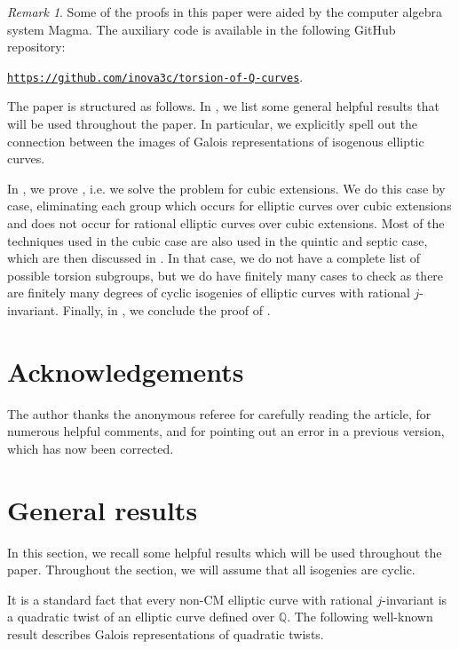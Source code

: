 \documentclass[10pt,leqno]{amsart}
\newcommand{\Q}{\mathbb{Q}}
\theoremstyle{definition}
\theoremstyle{remark}
\newtheorem{remark}[theorem]{Remark}
\numberwithin{theorem}{section}
\begin{document}
\begin{remark}
    Some of the proofs in this paper were aided by the computer algebra system Magma. The auxiliary code is available in the following GitHub repository:
    \begin{center}
        \hyperlink{https://github.com/inova3c/torsion-of-Q-curves}{\texttt{https://github.com/inova3c/torsion-of-Q-curves}}.
    \end{center}


\end{remark}

The paper is structured as follows. In , we list some general helpful results that will be used throughout the paper. In particular, we explicitly spell out the connection between the images of Galois representations of isogenous elliptic curves.

In , we prove , i.e. we solve the problem for cubic extensions. We do this case by case, eliminating each group which occurs for elliptic curves over cubic extensions and does not occur for rational elliptic curves over cubic extensions. Most of the techniques used in the cubic case are also used in the quintic and septic case, which are then discussed in . In that case, we do not have a complete list of possible torsion subgroups, but we do have finitely many cases to check as there are finitely many degrees of cyclic isogenies of elliptic curves with rational $j$-invariant. Finally, in , we conclude the proof of . 

\section*{Acknowledgements}

The author thanks the anonymous referee for carefully reading the article, for numerous helpful comments, and for pointing out an error in a previous version, which has now been corrected. 

\section{General results}\label{generalities}
In this section, we recall some helpful results which will be used throughout the paper. Throughout the section, we will assume that all isogenies are cyclic.

It is a standard fact that every non-CM elliptic curve with rational $j$-invariant is a quadratic twist of an elliptic curve defined over $\Q$.  The following well-known result describes Galois representations of quadratic twists.
\end{document}
